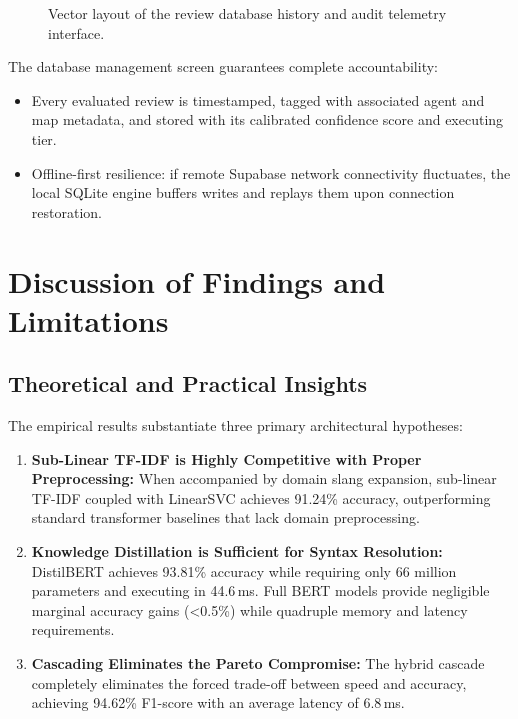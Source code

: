 \begin{figure}[htbp]
\begin{tcolorbox}
    \vspace{0.3cm}
\end{tcolorbox}
\caption{Vector layout of the review database history and audit telemetry interface.}
\label{fig:hud_screen_db}
\end{figure}

The database management screen guarantees complete accountability:
\begin{itemize}
    \item Every evaluated review is timestamped, tagged with associated agent and map metadata, and stored with its calibrated confidence score and executing tier.
    \item Offline-first resilience: if remote Supabase network connectivity fluctuates, the local SQLite engine buffers writes and replays them upon connection restoration.
\end{itemize}

\section{Discussion of Findings and Limitations}
\label{sec:discussion_limitations}

\subsection{Theoretical and Practical Insights}
The empirical results substantiate three primary architectural hypotheses:
\begin{enumerate}
    \item \textbf{Sub-Linear TF-IDF is Highly Competitive with Proper Preprocessing:} When accompanied by domain slang expansion, sub-linear TF-IDF coupled with LinearSVC achieves 91.24\% accuracy, outperforming standard transformer baselines that lack domain preprocessing.
    \item \textbf{Knowledge Distillation is Sufficient for Syntax Resolution:} DistilBERT achieves 93.81\% accuracy while requiring only 66 million parameters and executing in 44.6\,ms. Full BERT models provide negligible marginal accuracy gains (<0.5\%) while quadruple memory and latency requirements.
    \item \textbf{Cascading Eliminates the Pareto Compromise:} The hybrid cascade completely eliminates the forced trade-off between speed and accuracy, achieving 94.62\% F1-score with an average latency of 6.8\,ms.
\end{enumerate}


